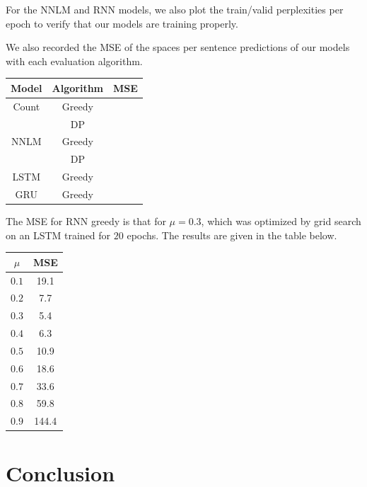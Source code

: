 \documentclass[11pt]{article}
\begin{document}
For the NNLM and RNN models, we also plot the train/valid perplexities per epoch to verify that our models are training properly. 

We also recorded the MSE of the spaces per sentence predictions of our models with each evaluation algorithm. 

\begin{center}
  \begin{tabular}{| c | c | c |}
    \hline Model & Algorithm & MSE \\
    \hline Count & Greedy & \\
    & DP & \\
    NNLM & Greedy & \\
    & DP & \\
    LSTM & Greedy & \\
    GRU & Greedy & \\
    \hline
  \end{tabular}
\end{center}

The MSE for RNN greedy is that for $\mu = 0.3$, which was optimized by grid search on an LSTM trained for $20$ epochs. The results are given in the table below. 

\begin{center}
\begin{tabular}{| c | c |}
  \hline $\mu$ & MSE \\
  \hline $0.1$ & 19.1\\
  $0.2$ & 7.7\\
  $0.3$ & 5.4\\
  $0.4$ & 6.3\\
  $0.5$ & 10.9\\
  $0.6$ & 18.6\\
  $0.7$ & 33.6\\
  $0.8$ & 59.8\\
  $0.9$ & 144.4\\
  \hline
\end{tabular}
\end{center}

\section{Conclusion}





\end{document}
